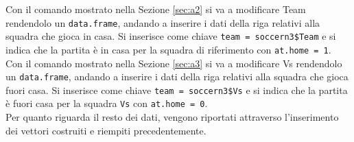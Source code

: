 Con il comando mostrato nella Sezione \ref{sec:a2} si va a modificare \textsf{Team} rendendolo un \texttt{data.frame}, andando a inserire i dati della riga relativi alla squadra che gioca in casa. Si inserisce come chiave \texttt{team = soccern3\$Team} e si indica che la partita è in casa per la squadra di riferimento con \texttt{at.home = 1}.\\

Con il comando mostrato nella Sezione \ref{sec:a3} si va a modificare \textsf{Vs} rendendolo un \texttt{data.frame}, andando a inserire i dati della riga relativi alla squadra che gioca fuori casa. Si inserisce come chiave \texttt{team = soccern3\$Vs} e si indica che la partita è fuori casa per la squadra \texttt{Vs} con \texttt{at.home = 0}.\\ Per quanto riguarda il resto dei dati, vengono riportati attraverso l'inserimento dei vettori costruiti e riempiti precedentemente.\\
